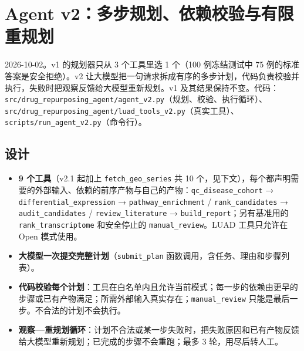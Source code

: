 \documentclass[
  10pt,
]{ctexart}
\author{}
\date{}
\providecommand{\tightlist}{%
  \setlength{\itemsep}{0pt}\setlength{\parskip}{0pt}}
\begin{document}
\section{Agent
v2：多步规划、依赖校验与有限重规划}\label{agent-v2ux591aux6b65ux89c4ux5212ux4f9dux8d56ux6821ux9a8cux4e0eux6709ux9650ux91cdux89c4ux5212}

2026-10-02。v1 的规划器只从 3 个工具里选 1 个（100 例冻结测试中 75
例的标准答案是安全拒绝）。v2
让大模型把一句请求拆成有序的多步计划，代码负责校验并执行，失败时把观察反馈给大模型重新规划。v1
及其结果保持不变。代码：\texttt{src/\allowbreak{}drug\_\allowbreak{}repurposing\_\allowbreak{}agent/\allowbreak{}agent\_\allowbreak{}v2.\allowbreak{}py}（规划、校验、执行循环）、\texttt{src/\allowbreak{}drug\_\allowbreak{}repurposing\_\allowbreak{}agent/\allowbreak{}luad\_\allowbreak{}tools\_\allowbreak{}v2.\allowbreak{}py}（真实工具）、\texttt{scripts/\allowbreak{}run\_\allowbreak{}agent\_\allowbreak{}v2.\allowbreak{}py}（命令行）。

\subsection{设计}\label{ux8bbeux8ba1}

\begin{itemize}
\tightlist
\item
  \textbf{9 个工具}（v2.1 起加上 \texttt{fetch\_\allowbreak{}geo\_\allowbreak{}series} 共 10
  个，见下文），每个都声明需要的外部输入、依赖的前序产物与自己的产物：\texttt{qc\_\allowbreak{}disease\_\allowbreak{}cohort}
  → \texttt{differential\_\allowbreak{}expression} → \texttt{pathway\_\allowbreak{}enrichment} /
  \texttt{rank\_\allowbreak{}candidates} → \texttt{audit\_\allowbreak{}candidates} /
  \texttt{review\_\allowbreak{}literature} → \texttt{build\_\allowbreak{}report}；另有基准用的
  \texttt{rank\_\allowbreak{}transcriptome} 和安全停止的
  \texttt{manual\_\allowbreak{}review}。LUAD 工具只允许在 Open 模式使用。
\item
  \textbf{大模型一次提交完整计划}（\texttt{submit\_\allowbreak{}plan}
  函数调用，含任务、理由和步骤列表）。
\item
  \textbf{代码校验每个计划}：工具在白名单内且允许当前模式；每一步的依赖由更早的步骤或已有产物满足；所需外部输入真实存在；\texttt{manual\_\allowbreak{}review}
  只能是最后一步。不合法的计划不会执行。
\item
  \textbf{观察---重规划循环}：计划不合法或某一步失败时，把失败原因和已有产物反馈给大模型重新规划；已完成的步骤不会重跑；最多
  3 轮，用尽后转人工。
\end{itemize}
\end{document}
